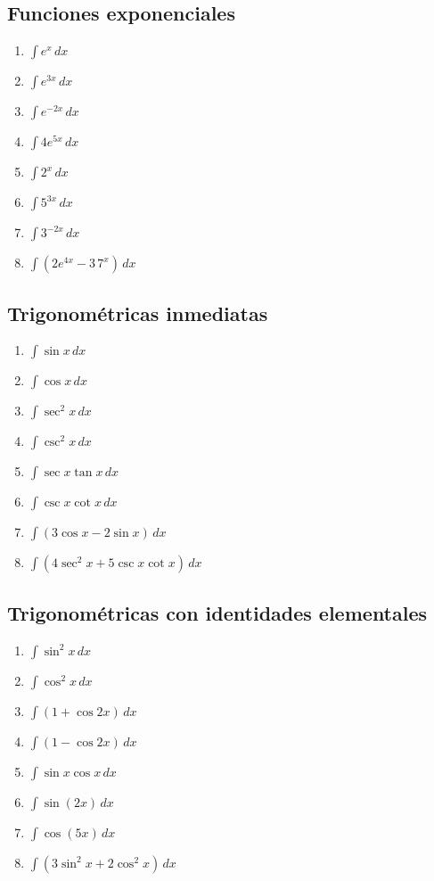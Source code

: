 \documentclass[12pt]{article}
\theoremstyle{definition}
\theoremstyle{remark}
\begin{document}
\subsection{Funciones exponenciales}
\begin{enumerate}[label=\arabic*.,start=41]
\item $\displaystyle \int e^x\,dx$
\item $\displaystyle \int e^{3x}\,dx$
\item $\displaystyle \int e^{-2x}\,dx$
\item $\displaystyle \int 4e^{5x}\,dx$
\item $\displaystyle \int 2^x\,dx$
\item $\displaystyle \int 5^{3x}\,dx$
\item $\displaystyle \int 3^{-2x}\,dx$
\item $\displaystyle \int(2e^{4x}-3\,7^x)\,dx$
\end{enumerate}

\subsection{Trigonométricas inmediatas}
\begin{enumerate}[label=\arabic*.,start=49]
\item $\displaystyle \int\sin x\,dx$
\item $\displaystyle \int\cos x\,dx$
\item $\displaystyle \int\sec^2x\,dx$
\item $\displaystyle \int\csc^2x\,dx$
\item $\displaystyle \int\sec x\tan x\,dx$
\item $\displaystyle \int\csc x\cot x\,dx$
\item $\displaystyle \int(3\cos x-2\sin x)\,dx$
\item $\displaystyle \int(4\sec^2x+5\csc x\cot x)\,dx$
\end{enumerate}

\subsection{Trigonométricas con identidades elementales}
\begin{enumerate}[label=\arabic*.,start=57]
\item $\displaystyle \int\sin^2x\,dx$
\item $\displaystyle \int\cos^2x\,dx$
\item $\displaystyle \int(1+\cos 2x)\,dx$
\item $\displaystyle \int(1-\cos 2x)\,dx$
\item $\displaystyle \int\sin x\cos x\,dx$
\item $\displaystyle \int\sin(2x)\,dx$
\item $\displaystyle \int\cos(5x)\,dx$
\item $\displaystyle \int(3\sin^2x+2\cos^2x)\,dx$
\end{enumerate}
\end{document}
